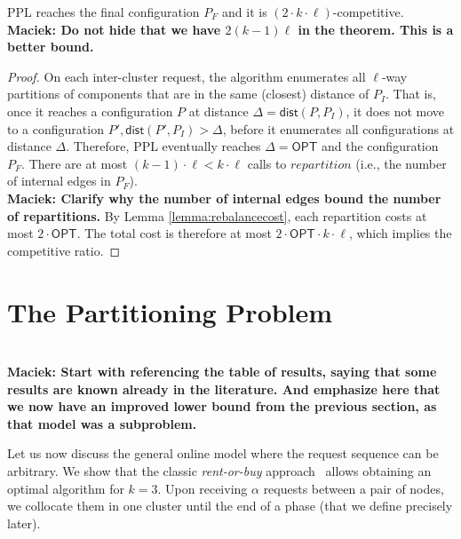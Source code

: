 \documentclass[manuscript,screen=true, review, anonymous]{acmart}
\newcommand{\OPT}{\textsf{OPT}\xspace}
\newcommand{\PPL}{\textsf{PPL}\xspace}
\newcommand{\OBRP}{BRP}
\newcommand{\dist}{\textsf{dist}}
\newcommand\mahmoud[1]{\color{orange}\textbf{\\ Mahmoud: #1}\\\color{black}}
\newcommand\maciek[1]{\color{brown}\textbf{\\ Maciek: #1}\color{black}}
\begin{document}
\begin{theorem}	\label{thm:upperbound}
	\PPL reaches the final configuration $P_F$ and it is $(2\cdot k\cdot\ell)$-competitive.
	\maciek{Do not hide that we have $2(k-1)\ell$ in the theorem. This is a better bound.}
\end{theorem}
\begin{proof}
	On each inter-cluster request,
	the algorithm enumerates all $\ell$-way partitions of components
	that are in the same (closest) distance of $P_I$.
	That is, 
	once it reaches a configuration $P$ at distance $\Delta = \dist(P, P_I)$,
	it does not move to a configuration
	$P', \dist(P', P_I) > \Delta$,
	before it enumerates all configurations at distance $\Delta$.
	Therefore,
	\PPL eventually reaches $\Delta=\OPT$ and the configuration $P_F$.
	There are at most $(k-1)\cdot\ell < k\cdot\ell $ calls   to $\mathit{repartition}$
	(i.e., the number of internal edges in $P_F$).
	\maciek{Clarify why the number of internal edges bound the number of repartitions.}
	By Lemma \ref{lemma:rebalancecost},
	each repartition costs at most $2\cdot\OPT$.
	The total cost is therefore at most $2\cdot\OPT\cdot k\cdot\ell$, which implies the competitive ratio.
\end{proof}


\section{The Partitioning Problem}
\label{sec:part}



\maciek{Start with referencing the table of results, saying that some results are known already in the literature. And emphasize here that we now have an improved lower bound from the previous section, as that model was a subproblem.}

Let us now discuss the general online
model where the request sequence
can be arbitrary.
We show that the classic \emph{rent-or-buy} approach~\cite{karlin-ski-rental} allows obtaining an optimal algorithm for $k=3$.
Upon receiving $\alpha$ requests between a pair of nodes, we collocate them in one cluster until the end of a phase (that we define precisely later).
\end{document}
